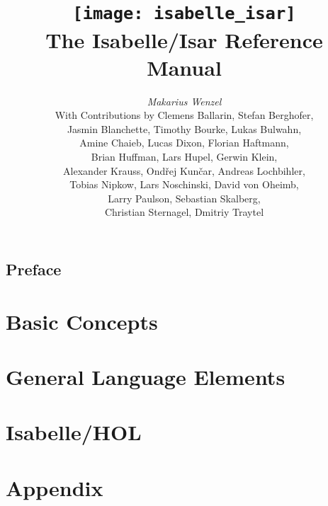 \documentclass[12pt,a4paper,fleqn]{report}
\title{\texttt{[image: isabelle\_isar]} \\[4ex] The Isabelle/Isar Reference Manual}
\author{\emph{Makarius Wenzel} \\[3ex]
  With Contributions by
  Clemens Ballarin,
  Stefan Berghofer, \\
  Jasmin Blanchette,
  Timothy Bourke,
  Lukas Bulwahn, \\
  Amine Chaieb,
  Lucas Dixon,
  Florian Haftmann, \\
  Brian Huffman,
  Lars Hupel,
  Gerwin Klein, \\
  Alexander Krauss,
  Ond\v{r}ej Kun\v{c}ar,
  Andreas Lochbihler, \\
  Tobias Nipkow,
  Lars Noschinski,
  David von Oheimb, \\
  Larry Paulson,
  Sebastian Skalberg, \\
  Christian Sternagel,
  Dmitriy Traytel
}
\let\intorig=\int  %
\begin{document}
\maketitle 

\chapter*{Preface}

\tableofcontents
\listoffigures
\clearfirst

\part{Basic Concepts}



\part{General Language Elements}







\part{Isabelle/HOL}\label{part:hol}


\part{Appendix}
\appendix

\let\int\intorig


\begingroup
  \tocentry{\bibname}
   \small\raggedright\frenchspacing
  
\endgroup

\tocentry{\indexname}
\printindex
\end{document}
